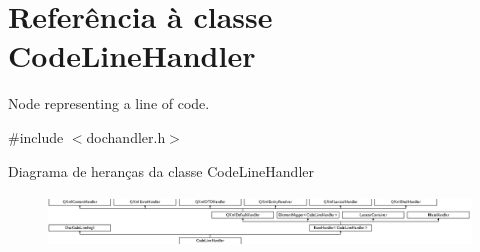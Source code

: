 \hypertarget{class_code_line_handler}{\section{Referência à classe Code\-Line\-Handler}
\label{class_code_line_handler}
}


Node representing a line of code.  




{\ttfamily \#include $<$dochandler.\-h$>$}

Diagrama de heranças da classe Code\-Line\-Handler\begin{figure}[H]
\begin{center}
\leavevmode
\includegraphics[height=1.385281cm]{class_code_line_handler}
\end{center}
\end{figure}

